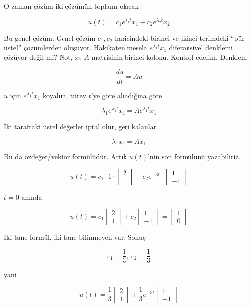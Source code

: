 \documentclass[12pt,fleqn]{article}\usepackage{../../common}
\begin{document}
O zaman çözüm iki çözümün toplamı olacak

$$ u(t) = c_1 e^{\lambda_1 t}x_1 + c_2 e^{\lambda_2 t}x_2$$

Bu genel çözüm. Genel çözüm $c_1, c_2$ haricindeki birinci ve ikinci terimdeki
``pür üstel'' çözümlerden oluşuyor. Hakikaten mesela $ e^{\lambda_1 t}x_1 $
diferansiyel denklemi çözüyor değil mi? Not, $x_1$ $A$ matrisinin birinci
kolonu. Kontrol edelim. Denklem

$$ \frac{du}{dt} = Au$$

$u$ için $e^{\lambda_1t}x_1$ koyalım, türev $t$'ye göre alındığına göre

$$ \lambda_1 e^{\lambda_1t}x_1 = A e^{\lambda_1t}x_1$$

İki taraftaki üstel değerler iptal olur, geri kalanlar

$$ \lambda_1 x_1 = A x_1$$

Bu da özdeğer/vektör formülüdür. Artık $u(t)$'nin son formülünü
yazabiliriz. 

$$ u(t) =
c_1 \cdot 1 \cdot 
\left[\begin{array}{c}
2 \\ 1
\end{array}\right]
+
c_2 e^{-3t} \cdot 
\left[\begin{array}{r}
1 \\ -1
\end{array}\right]
 $$

$t=0$ anında

$$ u(t) =
c_1 
\left[\begin{array}{c}
2 \\ 1
\end{array}\right]
+
c_2 
\left[\begin{array}{r}
1 \\ -1
\end{array}\right] = 
\left[\begin{array}{c}
1 \\ 0
\end{array}\right] 
 $$

İki tane formül, iki tane bilinmeyen var. Sonuç

$$ c_1 = \frac{1}{3},\ c_2 = \frac{1}{3}$$

yani

$$ u(t) =
\frac{1}{3} \left[\begin{array}{c} 2 \\ 1 \end{array}\right]
+
\frac{1}{3}  e^{-3t}  \left[\begin{array}{r} 1 \\ -1 \end{array}\right] 
 $$
\end{document}
